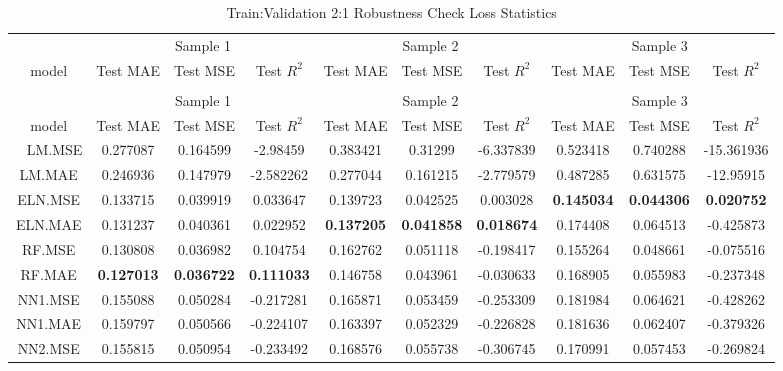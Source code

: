 \begingroup\fontsize{6}{8}\selectfont

\begin{longtable}[t]{cccccccccc}
\caption{\label{tab:}Train:Validation 2:1 Robustness Check Loss Statistics}\\
\toprule
\multicolumn{1}{c}{ } & \multicolumn{3}{c}{Sample 1} & \multicolumn{3}{c}{Sample 2} & \multicolumn{3}{c}{Sample 3} \\
\cmidrule(l{3pt}r{3pt}){2-4} \cmidrule(l{3pt}r{3pt}){5-7} \cmidrule(l{3pt}r{3pt}){8-10}
model & Test MAE & Test MSE & Test $R^2$ & Test MAE & Test MSE & Test $R^2$ & Test MAE & Test MSE & Test $R^2$\\
\midrule
\endfirsthead
\caption[]{Train:Validation 2:1 Robustness Check Loss Statistics }\\
\toprule
\multicolumn{1}{c}{ } & \multicolumn{3}{c}{Sample 1} & \multicolumn{3}{c}{Sample 2} & \multicolumn{3}{c}{Sample 3} \\
\cmidrule(l{3pt}r{3pt}){2-4} \cmidrule(l{3pt}r{3pt}){5-7} \cmidrule(l{3pt}r{3pt}){8-10}
model & Test MAE & Test MSE & Test $R^2$ & Test MAE & Test MSE & Test $R^2$ & Test MAE & Test MSE & Test $R^2$\\
\midrule
\endhead
\
\endfoot
\bottomrule
\endlastfoot
LM.MSE & 0.277087 & 0.164599 & -2.98459 & 0.383421 & 0.31299 & -6.337839 & 0.523418 & 0.740288 & -15.361936\\
LM.MAE & 0.246936 & 0.147979 & -2.582262 & 0.277044 & 0.161215 & -2.779579 & 0.487285 & 0.631575 & -12.95915\\
ELN.MSE & 0.133715 & 0.039919 & 0.033647 & 0.139723 & 0.042525 & 0.003028 & \textbf{0.145034} & \textbf{0.044306} & \textbf{0.020752}\\
ELN.MAE & 0.131237 & 0.040361 & 0.022952 & \textbf{0.137205} & \textbf{0.041858} & \textbf{0.018674} & 0.174408 & 0.064513 & -0.425873\\
RF.MSE & 0.130808 & 0.036982 & 0.104754 & 0.162762 & 0.051118 & -0.198417 & 0.155264 & 0.048661 & -0.075516\\
RF.MAE & \textbf{0.127013} & \textbf{0.036722} & \textbf{0.111033} & 0.146758 & 0.043961 & -0.030633 & 0.168905 & 0.055983 & -0.237348\\
NN1.MSE & 0.155088 & 0.050284 & -0.217281 & 0.165871 & 0.053459 & -0.253309 & 0.181984 & 0.064621 & -0.428262\\
NN1.MAE & 0.159797 & 0.050566 & -0.224107 & 0.163397 & 0.052329 & -0.226828 & 0.181636 & 0.062407 & -0.379326\\
NN2.MSE & 0.155815 & 0.050954 & -0.233492 & 0.168576 & 0.055738 & -0.306745 & 0.170991 & 0.057453 & -0.269824\\

\end{longtable}
